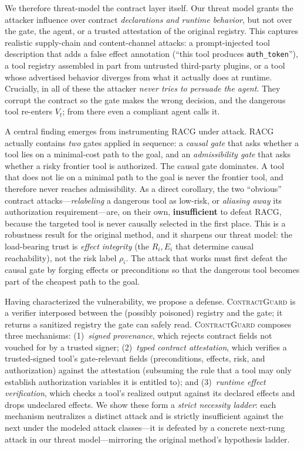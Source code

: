 \documentclass[conference,onecolumn]{IEEEtran}
\theoremstyle{definition}
\newcommand{\racg}{\textsc{RACG}}
\newcommand{\cg}{\textsc{ContractGuard}}
\newcommand{\Vt}{V_t}
\newcommand{\code}[1]{\texttt{#1}}
\begin{document}
We therefore threat-model the contract layer itself. Our threat model grants the
attacker influence over contract \emph{declarations and runtime behavior}, but
not over the gate, the agent, or a trusted attestation of the original registry.
This captures realistic supply-chain and content-channel attacks: a
prompt-injected tool description that adds a false effect annotation
(``this tool produces \code{auth\_token}''), a tool registry assembled in part
from untrusted third-party plugins, or a tool whose advertised behavior diverges
from what it actually does at runtime. Crucially, in all of these the attacker
\emph{never tries to persuade the agent}. They corrupt the contract so the gate
makes the wrong decision, and the dangerous tool re-enters $\Vt$; from there even
a compliant agent calls it.

A central finding emerges from instrumenting \racg{} under attack. \racg{}
actually contains \emph{two} gates applied in sequence: a \emph{causal gate} that
asks whether a tool lies on a minimal-cost path to the goal, and an
\emph{admissibility gate} that asks whether a risky frontier tool is authorized.
The causal gate dominates. A tool that does not lie on a minimal path to the goal
is never the frontier tool, and therefore never reaches admissibility. As a
direct corollary, the two ``obvious'' contract attacks---\emph{relabeling} a
dangerous tool as low-risk, or \emph{aliasing away} its authorization
requirement---are, on their own, \textbf{insufficient} to defeat \racg, because
the targeted tool is never causally selected in the first place. This is a
robustness result for the original method, and it sharpens our threat model: the
load-bearing trust is \emph{effect integrity} (the $R_i,E_i$ that determine
causal reachability), not the risk label $\rho_i$. The attack that works must
first defeat the causal gate by forging effects or preconditions so that the
dangerous tool becomes part of the cheapest path to the goal.

Having characterized the vulnerability, we propose a defense. \cg{} is a verifier
interposed between the (possibly poisoned) registry and the gate; it returns a
sanitized registry the gate can safely read. \cg{} composes three mechanisms:
(1)~\emph{signed provenance}, which rejects contract fields not vouched for by a
trusted signer; (2)~\emph{typed contract attestation}, which verifies a
trusted-signed tool's gate-relevant fields (preconditions, effects, risk, and
authorization) against the attestation (subsuming the rule that a tool may only
establish authorization variables it is entitled to);
and (3)~\emph{runtime effect verification}, which
checks a tool's realized output against its declared effects and drops
undeclared effects. We show these form a \emph{strict necessity ladder}: each
mechanism neutralizes a distinct attack and is strictly insufficient against the
next under the modeled attack classes---it is defeated by a concrete next-rung
attack in our threat model---mirroring the original method's hypothesis ladder.
\end{document}
